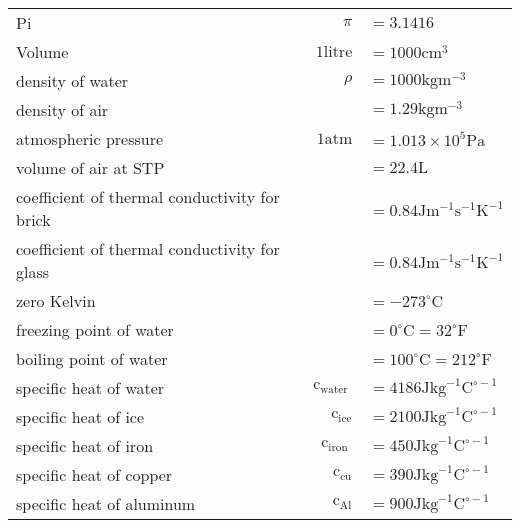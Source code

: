 \documentclass{extarticle}
\begin{document}
\begin{tabularx}{\textwidth}{Xr@{}l}
Pi & $\pi$ & $=3.1416$ \\

Volume & $1 \text {litre}$ & $=1000 \mathrm{cm}^{3}$ \\

density of water & $\rho$ & $=1000 \mathrm{kg} \mathrm{m}^{-3}$ \\

density of air & & $=1.29 \mathrm{kg} \mathrm{m}^{-3}$ \\

atmospheric pressure & $1 \mathrm{atm}$ & $=1.013 \times 10^{5} \mathrm{Pa}$ \\

volume of air at STP & & $=22.4 \mathrm{L}$ \\

coefficient of thermal conductivity for brick & & $=0.84 \mathrm{J} \mathrm{m}^{-1} \mathrm{s}^{-1} \mathrm{K}^{-1}$ \\

coefficient of thermal conductivity for glass & & $=0.84 \mathrm{J} \mathrm{m}^{-1} \mathrm{s}^{-1} \mathrm{K}^{-1}$ \\

zero Kelvin & & $=-273^{\circ} \mathrm{C}$ \\

freezing point of water & & $=0^{\circ} \mathrm{C}=32^{\circ} \mathrm{F}$ \\

boiling point of water & & $=100^{\circ} \mathrm{C}=212^{\circ} \mathrm{F}$ \\

specific heat of water & $\mathrm{c}_{\text {water }}$ & $=4186 \mathrm{J} \mathrm{kg}^{-1} \mathrm{C}^{\circ-1}$ \\

specific heat of ice & $\quad \mathrm{c}_{\mathrm{ice}}$ & $=2100 \mathrm{J} \mathrm{kg}^{-1} \mathrm{C}^{\circ-1}$ \\

specific heat of iron & $\quad \mathrm{c}_{\text {iron }}$ & $=450 \mathrm{J} \mathrm{kg}^{-1} \mathrm{C}^{\circ-1}$ \\

specific heat of copper & $\mathrm{c}_{\mathrm{cu}}$ & $=390 \mathrm{J} \mathrm{kg}^{-1} \mathrm{C}^{\circ-1}$ \\

specific heat of aluminum & $\mathrm{c}_{\mathrm{Al}}$ & $=900 \mathrm{J} \mathrm{kg}^{-1} \mathrm{C}^{\circ-1}$ \\


\end{tabularx}
\end{document}
